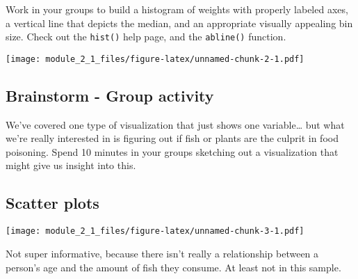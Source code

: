 \documentclass[
]{article}
\newenvironment{Shaded}{\begin{snugshade}}{\end{snugshade}}
\newcommand{\AttributeTok}[1]{\textcolor[rgb]{0.77,0.63,0.00}{#1}}
\newcommand{\ConstantTok}[1]{\textcolor[rgb]{0.00,0.00,0.00}{#1}}
\newcommand{\DecValTok}[1]{\textcolor[rgb]{0.00,0.00,0.81}{#1}}
\newcommand{\FunctionTok}[1]{\textcolor[rgb]{0.00,0.00,0.00}{#1}}
\newcommand{\NormalTok}[1]{#1}
\newcommand{\SpecialCharTok}[1]{\textcolor[rgb]{0.00,0.00,0.00}{#1}}
\newcommand{\StringTok}[1]{\textcolor[rgb]{0.31,0.60,0.02}{#1}}
\begin{document}
Work in your groups to build a histogram of weights with properly
labeled axes, a vertical line that depicts the median, and an
appropriate visually appealing bin size. Check out the \texttt{hist()}
help page, and the \texttt{abline()} function.

\begin{Shaded}
\end{Shaded}

\texttt{[image: module\_2\_1\_files/figure-latex/unnamed-chunk-2-1.pdf]}

\hypertarget{brainstorm---group-activity}{%
\subsection{Brainstorm - Group
activity}\label{brainstorm---group-activity}}

We've covered one type of visualization that just shows one
variable\ldots{} but what we're really interested in is figuring out if
fish or plants are the culprit in food poisoning. Spend 10 minutes in
your groups sketching out a visualization that might give us insight
into this.

\hypertarget{scatter-plots}{%
\subsection{Scatter plots}\label{scatter-plots}}

\begin{Shaded}
\end{Shaded}

\texttt{[image: module\_2\_1\_files/figure-latex/unnamed-chunk-3-1.pdf]}

Not super informative, because there isn't really a relationship between
a person's age and the amount of fish they consume. At least not in this
sample.
\end{document}
